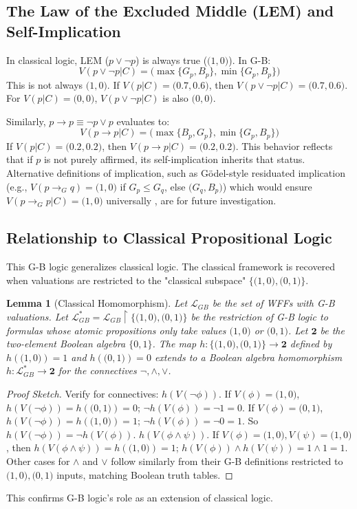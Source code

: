 \documentclass[11pt]{article}
\newcommand{\GB}[2]{\bigl(#1,#2\bigr)} %
\newtheorem{lemma}{Lemma}[section]
\theoremstyle{remark}
\begin{document}
\subsection{The Law of the Excluded Middle (LEM) and Self-Implication} \label{sec:lem_self_implication_main}
In classical logic, LEM ($p \lor \neg p$) is always true ($\GB{1}{0}$). In G-B:
$$V(p \lor \neg p|C) = \GB{\max\{G_p, B_p\}}{\min\{G_p, B_p\}}$$
This is not always $\GB{1}{0}$. If $V(p|C) = \GB{0.7}{0.6}$, then $V(p \lor \neg p|C) = \GB{0.7}{0.6}$.
For $V(p|C)=\GB{0}{0}$, $V(p \lor \neg p|C)$ is also $\GB{0}{0}$.

Similarly, $p \rightarrow p \equiv \neg p \lor p$ evaluates to:
$$V(p \rightarrow p|C) = \GB{\max\{B_p, G_p\}}{\min\{G_p, B_p\}}$$
If $V(p|C) = \GB{0.2}{0.2}$, then $V(p \rightarrow p|C) = \GB{0.2}{0.2}$. This behavior reflects that if $p$ is not purely affirmed, its self-implication inherits that status. Alternative definitions of implication, such as Gödel-style residuated implication (e.g., $V(p \rightarrow_G q) = \GB{1}{0}$ if $G_p \le G_q$, else $\GB{G_q}{B_p}$) which would ensure $V(p \rightarrow_G p|C) = \GB{1}{0}$ universally \cite{hajek1998}, are for future investigation.

\subsection{Relationship to Classical Propositional Logic} \label{sec:classical_relation_main}
This G-B logic generalizes classical logic. The classical framework is recovered when valuations are restricted to the "classical subspace" $\{\GB{1}{0}, \GB{0}{1}\}$.
\begin{lemma}[Classical Homomorphism] \label{lem:classical_homomorphism}
Let $\mathcal{L}_{GB}$ be the set of WFFs with G-B valuations. Let $\mathcal{L}_{GB}^* = \mathcal{L}_{GB} \upharpoonright \{\GB{1}{0}, \GB{0}{1}\}$ be the restriction of G-B logic to formulas whose atomic propositions only take values $\GB{1}{0}$ or $\GB{0}{1}$. Let $\mathbf{2}$ be the two-element Boolean algebra $\{0,1\}$. The map $h: \{\GB{1}{0}, \GB{0}{1}\} \to \mathbf{2}$ defined by $h(\GB{1}{0})=1$ and $h(\GB{0}{1})=0$ extends to a Boolean algebra homomorphism $h: \mathcal{L}_{GB}^* \to \mathbf{2}$ for the connectives $\neg, \land, \lor$.
\end{lemma}
\begin{proof}[Proof Sketch]
Verify for connectives:
$h(V(\neg \phi))$. If $V(\phi)=\GB{1}{0}$, $h(V(\neg \phi))=h(\GB{0}{1})=0$; $\neg h(V(\phi))=\neg 1 = 0$. If $V(\phi)=\GB{0}{1}$, $h(V(\neg \phi))=h(\GB{1}{0})=1$; $\neg h(V(\phi))=\neg 0 = 1$. So $h(V(\neg \phi)) = \neg h(V(\phi))$.
$h(V(\phi \land \psi))$. If $V(\phi)=\GB{1}{0}, V(\psi)=\GB{1}{0}$, then $h(V(\phi \land \psi))=h(\GB{1}{0})=1$; $h(V(\phi)) \land h(V(\psi)) = 1 \land 1 = 1$. Other cases for $\land$ and $\lor$ follow similarly from their G-B definitions restricted to $\GB{1}{0}, \GB{0}{1}$ inputs, matching Boolean truth tables.
\end{proof}
This confirms G-B logic's role as an extension of classical logic.
\end{document}

